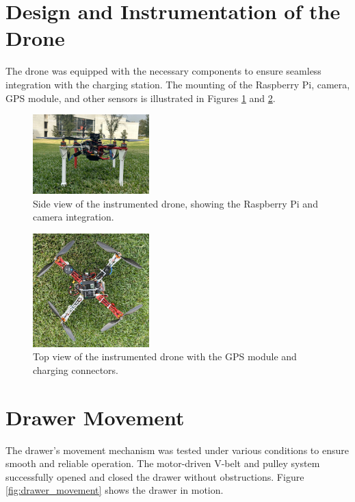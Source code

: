 \section{Design and Instrumentation of the Drone}

The drone was equipped with the necessary components to ensure seamless integration with the charging station. The mounting of the Raspberry Pi, camera, GPS module, and other sensors is illustrated in Figures \ref{fig:drone_instrumentation_1} and \ref{fig:drone_instrumentation_2}.

\begin{figure}[H]
    \centering
    \includegraphics[width=0.4\textwidth]{pictures/drone_side_view.jpeg}
    \caption{Side view of the instrumented drone, showing the Raspberry Pi and camera integration.}
    \label{fig:drone_instrumentation_1}
\end{figure}

\begin{figure}[H]
    \centering
    \includegraphics[width=0.4\textwidth]{pictures/drone_top_view.jpeg}
    \caption{Top view of the instrumented drone with the GPS module and charging connectors.}
    \label{fig:drone_instrumentation_2}
\end{figure}

\section{Drawer Movement}

The drawer's movement mechanism was tested under various conditions to ensure smooth and reliable operation. The motor-driven V-belt and pulley system successfully opened and closed the drawer without obstructions. Figure \ref{fig:drawer_movement} shows the drawer in motion.

